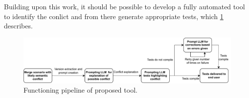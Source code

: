 Building upon this work, it should be possible to develop a fully automated tool to identify the conlict and from there generate appropriate tests,
which \ref{fig:tool} describes.
\begin{figure}
    \centering
    \includegraphics[width=1\linewidth]{figures/tool.pdf}
    \caption{Functioning pipeline of proposed tool.}
    \label{fig:tool}
\end{figure}